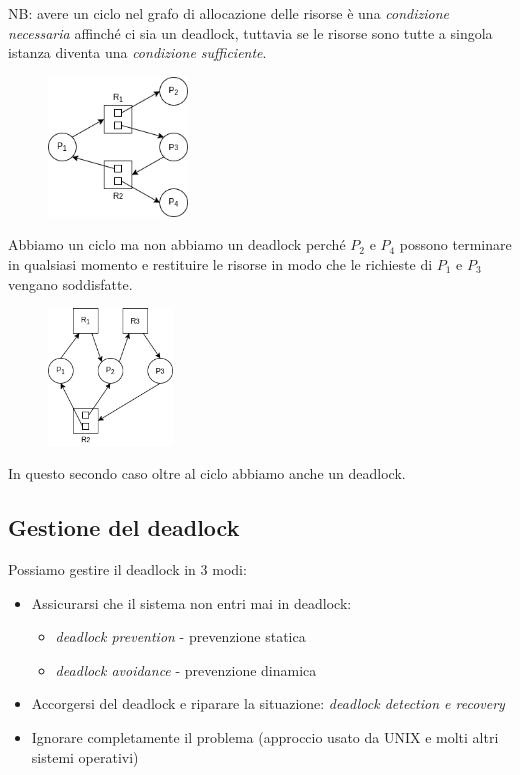NB: avere un ciclo nel grafo di allocazione delle risorse è una \emph{condizione necessaria} affinché ci sia un deadlock, tuttavia se le risorse sono tutte a singola istanza diventa una \emph{condizione sufficiente}.
\begin{figure}[H]
    \centering
    \includegraphics[width=140px]{images/8_Deadlock/loop_no_deadlock.png}
\end{figure}
Abbiamo un ciclo ma non abbiamo un deadlock perché $P_2$ e $P_4$ possono terminare in qualsiasi momento e restituire le risorse in modo che le richieste di $P_1$ e $P_3$ vengano soddisfatte.
\begin{figure}[H]
    \centering
    \includegraphics[width=125px]{images/8_Deadlock/loop_deadlock.png}
\end{figure}
In questo secondo caso oltre al ciclo abbiamo anche un deadlock.

\subsection{Gestione del deadlock}
Possiamo gestire il deadlock in 3 modi:
\begin{itemize}
    \item Assicurarsi che il sistema non entri mai in deadlock:
    \begin{itemize}
        \item \emph{deadlock prevention} - prevenzione statica
        \item \emph{deadlock avoidance} - prevenzione dinamica
    \end{itemize}
    \item Accorgersi del deadlock e riparare la situazione: \emph{deadlock detection e recovery}
    \item Ignorare completamente il problema (approccio usato da UNIX e molti altri sistemi operativi)
\end{itemize}

